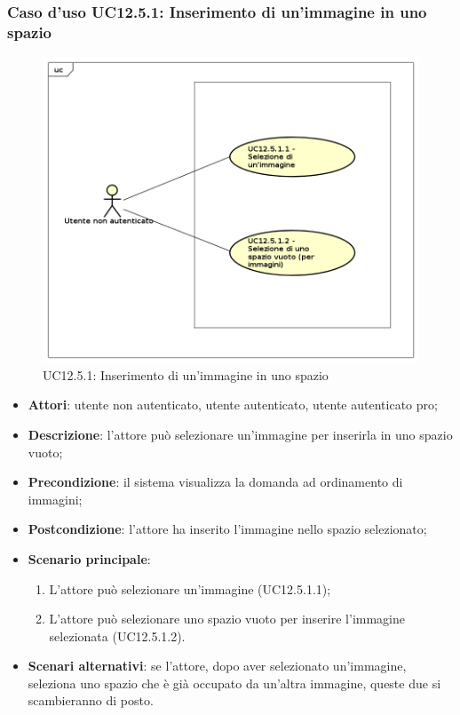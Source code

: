 \subsubsection{Caso d'uso UC12.5.1: Inserimento di un'immagine in uno spazio}
\label{UC12.5.1}
\begin{figure}[h]
	\centering
	\includegraphics[scale=0.5]{UML/UC12_5_1.png}
	\caption{UC12.5.1: Inserimento di un'immagine in uno spazio}
\end{figure}
\begin{itemize}
\item \textbf{Attori}: utente non autenticato, utente autenticato, utente autenticato pro;
\item \textbf{Descrizione}: l'attore può selezionare un'immagine per inserirla in uno spazio vuoto;
\item \textbf{Precondizione}: il sistema visualizza la domanda ad ordinamento di immagini;
\item \textbf{Postcondizione}: l'attore ha inserito l'immagine nello spazio selezionato;
\item \textbf{Scenario principale}: 
\begin{enumerate}
\item L'attore può selezionare un'immagine (UC12.5.1.1);
\item L'attore può selezionare uno spazio vuoto per inserire l'immagine selezionata (UC12.5.1.2).
\end{enumerate}
\item \textbf{Scenari alternativi}: se l'attore, dopo aver selezionato un'immagine, seleziona uno spazio che è già occupato da un'altra immagine, queste due si scambieranno di posto.
\end{itemize}

